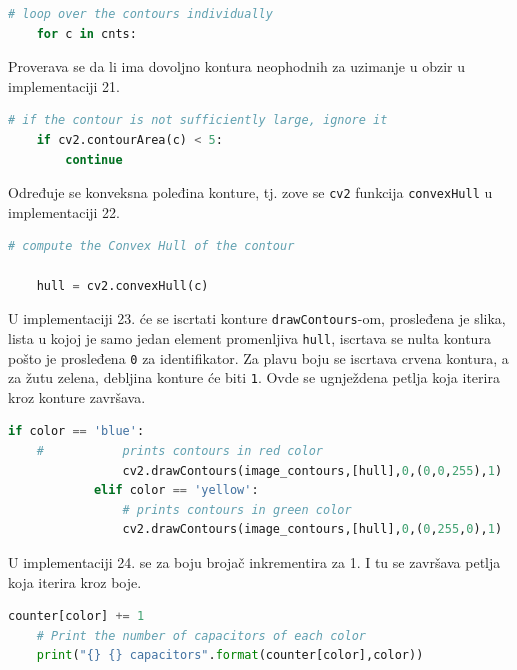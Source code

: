 \documentclass[fontsize=12bp, paper=a4]{scrarticle}
\begin{document}
\begin{lstlisting}[language=Python, caption={Započeto iteriranje}]
    # loop over the contours individually
    for c in cnts:
\end{lstlisting} 

Proverava se da li ima dovoljno kontura neophodnih za uzimanje u obzir u implementaciji 21.

\begin{lstlisting}[language=Python, caption={Ispitivanje kriterijuma dovoljnosti brojnosti kontura}]
    # if the contour is not sufficiently large, ignore it
    if cv2.contourArea(c) < 5:
        continue
\end{lstlisting} 

Određuje se konveksna poleđina konture, tj. zove se \verb|cv2| funkcija \verb|convexHull| u implementaciji 22.

\begin{lstlisting}[language=Python, caption={Računanje konveksnih poleđina}]
    # compute the Convex Hull of the contour
    
    hull = cv2.convexHull(c)
\end{lstlisting} 

U implementaciji 23. će se iscrtati konture \verb|drawContours|-om, prosleđena je slika, lista u kojoj je samo jedan element promenljiva \verb|hull|, iscrtava se nulta kontura pošto je prosleđena \verb|0| za identifikator. Za plavu boju se iscrtava crvena kontura, a za žutu zelena, debljina konture će biti \verb|1|. Ovde se ugnježdena petlja koja iterira kroz konture završava.

\begin{lstlisting}[language=Python, caption={Iscrtavanje kontura na osnovu boja}]
            if color == 'blue':
    # 			prints contours in red color
                cv2.drawContours(image_contours,[hull],0,(0,0,255),1)
            elif color == 'yellow':
                # prints contours in green color
                cv2.drawContours(image_contours,[hull],0,(0,255,0),1)
\end{lstlisting} 

U implementaciji 24. se za boju brojač inkrementira za 1.
I tu se završava petlja koja iterira kroz boje.

\begin{lstlisting}[language=Python, caption={Ispis broja kontura po boji}]     
    counter[color] += 1
    # Print the number of capacitors of each color
    print("{} {} capacitors".format(counter[color],color))
\end{lstlisting} 
\end{document}
